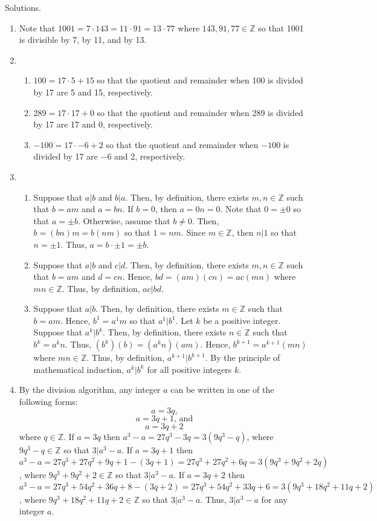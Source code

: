 \documentclass{article}
\newcommand{\integers}{\mathbb{Z}}
\begin{document}
Solutions.
\begin{enumerate}
	\item
		Note that $1001 = 7 \cdot 143 = 11 \cdot 91 = 13 \cdot 77$ where $143, 91, 77 \in \integers$ so that 1001 is divisible by 7, by 11, and by 13.
	\item
		\begin{enumerate}
			\item
				$100 = 17 \cdot 5 + 15$ so that the quotient and remainder when 100 is divided by 17 are 5 and 15, respectively.
			\item
				$289 = 17 \cdot 17 + 0$ so that the quotient and remainder when 289 is divided by 17 are 17 and 0, respectively.
			\item
				$-100 = 17 \cdot -6 + 2$ so that the quotient and remainder when $-100$ is divided by 17 are $-6$ and 2, respectively.
		\end{enumerate}
	\item
		\begin{enumerate}
			\item
				Suppose that $a|b$ and $b|a$. Then, by definition, there exists $m, n \in \integers$ such that $b = am$ and $a = bn$. If $b = 0$, then $a = 0n = 0$. Note that $0 = \pm 0$ so that $a = \pm b$. Otherwise, assume that $b \neq 0$. Then, $b = (bn)m = b(nm)$ so that $1 = nm$. Since $m \in \integers$, then $n | 1$ so that $n = \pm 1$. Thus, $a = b \cdot \pm 1 = \pm b$.
			\item
				Suppose that $a|b$ and $c|d$. Then, by definition, there exists $m, n \in \integers$ such that $b = am$ and $d = cn$. Hence, $bd = (am)(cn) = ac(mn)$ where $mn \in \integers$. Thus, by definition, $ac | bd$.
			\item
				Suppose that $a|b$. Then, by definition, there exists $m \in \integers$ such that $b = am$. Hence, $b^1 = a^1m$ so that $a^1 | b^1$. Let $k$ be a positive integer. Suppose that $a^k | b^k$. Then, by definition, there exists $n \in \integers$ such that $b^k = a^kn$. Thus, $(b^k)(b) = (a^kn)(am)$. Hence, $b^{k + 1} = a^{k + 1}(mn)$ where $mn \in \integers$. Thus, by definition, $a^{k + 1} | b^{k + 1}$. By the principle of mathematical induction, $a^k | b^k$ for all positive integers $k$.
		\end{enumerate}
	\item
		By the division algorithm, any integer $a$ can be written in one of the following forms:
		$$a = 3q\text{,}$$
		$$a = 3q + 1\text{, and}$$
		$$a = 3q + 2$$
		where $q \in \integers$. If $a = 3q$ then $a^3 - a = 27q^3 - 3q = 3(9q^3 - q)$, where $9q^3 - q \in \integers$ so that $3 | a^3 - a$. If $a = 3q + 1$ then $a^3 - a = 27q^3 + 27q^2 + 9q + 1 - (3q + 1) = 27q^3 + 27q^2 + 6q = 3(9q^3 + 9q^2 + 2q)$, where $9q^3 + 9q^2 + 2 \in \integers$ so that $3 | a^3 - a$. If $a = 3q + 2$ then $a^3 - a = 27q^3 + 54q^2 + 36q + 8 - (3q + 2) = 27q^3 + 54q^2 + 33q + 6 = 3(9q^3 + 18q^2 + 11q + 2)$, where $9q^3 + 18q^2 + 11q + 2 \in \integers$ so that $3 | a^3 - a$. Thus, $3 | a^3 - a$ for any integer $a$.

\end{enumerate}
\end{document}

